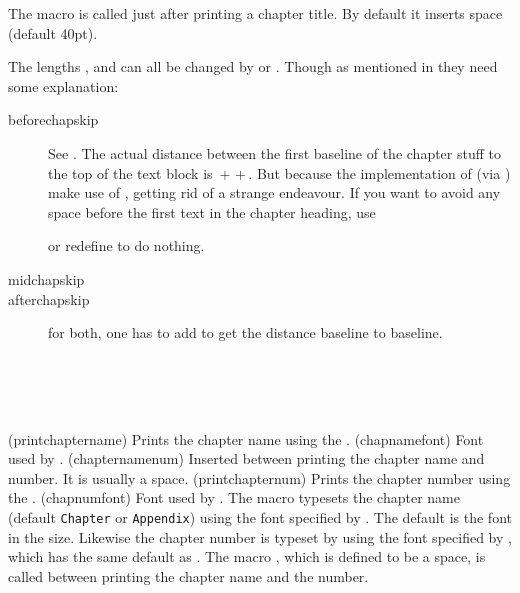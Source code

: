 The macro \cmd{\afterchaptertitle} is called just after printing a chapter
title. By default it inserts \lnc{\afterchapskip} space (default
40pt).

The lengths \lnc{\beforechapskip}, \lnc{\midchapskip} and \lnc{\afterchapskip}
can all be changed by \cmd{\setlength} or \cmd{\addtolength}. Though
as mentioned in  they need some explanation:
\begingroup
\medskip
\setlength\overfullrule{5pt}
\setlength\unitlength{\textwidth}
\addtolength{}
\renewcommand\descriptionlabel[1]{\hspace\labelsep\parbox{\unitlength}{\cs{#1}}}
\begin{description}
\item[beforechapskip] See .  The actual distance
  between the first baseline of the chapter stuff to the top of the
  text block is
  \cmd{\beforechapskip}\,+\,\cmd{\topskip}\,+\,\cmd{\baselineskip}.
  But because the implementation of \cmd{\chapter} (via
  \cmd{\chapterheadstart}) make use of \cmd{\vspace*}, getting rid of
  \cmd{\beforechapskip} a strange endeavour. If you want to avoid any
  space before the first text in the chapter heading, use
  \begin{lcode}
    \setlength\beforechapskip{-\baselineskip}
  \end{lcode}
  or redefine \cmd{\chapterheadstart} to do nothing.
\item[midchapskip] 
\item[afterchapskip] 
  for both, one has to add \cmd{\baselineskip} to
  get the distance baseline to baseline.
\end{description}
\endgroup





\begin{syntax}
\cmd{\printchaptername} \cmd{\chapnamefont} \\
\cmd{\chapternamenum} \\
\cmd{\printchapternum} \cmd{\chapnumfont} \\
\end{syntax}
\glossary(printchaptername)%
  {}%
  {Prints the chapter name using the .}
\glossary(chapnamefont)%
  {}%
  {Font used by .}
\glossary(chapternamenum)%
  {}%
  {Inserted between printing the chapter name and number. 
   It is usually a space.}
\glossary(printchapternum)%
  {}%
  {Prints the chapter number using the .}
\glossary(chapnumfont)%
  {}%
  {Font used by .}
The macro \cmd{\printchaptername} typesets the chapter name 
(default \texttt{Chapter} or \texttt{Appendix}) using the font 
specified by \cmd{\chapnamefont}. The default is the \cmd{\bfseries} font in
the \cmd{\huge} size. Likewise the chapter number is typeset by 
\cmd{\printchapternum} using the font specified by \cmd{\chapnumfont}, 
which has the same default as \cmd{\chapnamefont}. The macro 
\cmd{\chapternamenum}, which is defined to be a space, is called between 
printing the chapter name and the number. 

